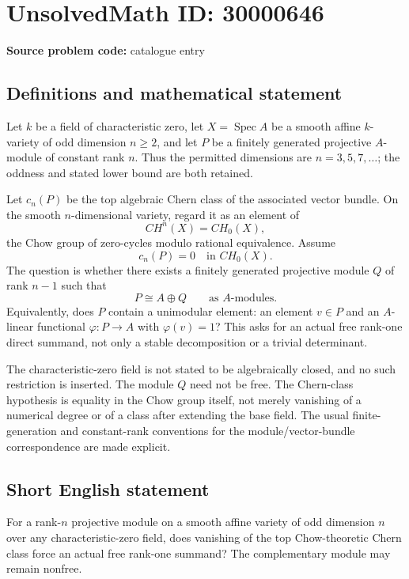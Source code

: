 \documentclass[11pt]{article}
\begin{document}
\section*{UnsolvedMath ID: 30000646}
\textbf{Source problem code:} catalogue entry
\subsection{Definitions and mathematical statement}
Let $k$ be a field of characteristic zero, let $X=\operatorname{Spec}A$ be a smooth affine $k$-variety of odd dimension $n\ge2$, and let $P$ be a finitely generated projective $A$-module of constant rank $n$. Thus the permitted dimensions are $n=3,5,7,\ldots$; the oddness and stated lower bound are both retained.

Let $c_n(P)$ be the top algebraic Chern class of the associated vector bundle. On the smooth $n$-dimensional variety, regard it as an element of
\[
 CH^n(X)=CH_0(X),
\]
the Chow group of zero-cycles modulo rational equivalence. Assume
\[
 c_n(P)=0\quad\text{in }CH_0(X).
\]
The question is whether there exists a finitely generated projective module $Q$ of rank $n-1$ such that
\[
 P\cong A\oplus Q\qquad\text{as }A\text{-modules}.
\]
Equivalently, does $P$ contain a unimodular element: an element $v\in P$ and an $A$-linear functional $\varphi:P\to A$ with $\varphi(v)=1$? This asks for an actual free rank-one direct summand, not only a stable decomposition or a trivial determinant.

The characteristic-zero field is not stated to be algebraically closed, and no such restriction is inserted. The module $Q$ need not be free. The Chern-class hypothesis is equality in the Chow group itself, not merely vanishing of a numerical degree or of a class after extending the base field. The usual finite-generation and constant-rank conventions for the module/vector-bundle correspondence are made explicit.
\subsection{Short English statement}
For a rank-$n$ projective module on a smooth affine variety of odd dimension $n$ over any characteristic-zero field, does vanishing of the top Chow-theoretic Chern class force an actual free rank-one summand? The complementary module may remain nonfree.
\end{document}
